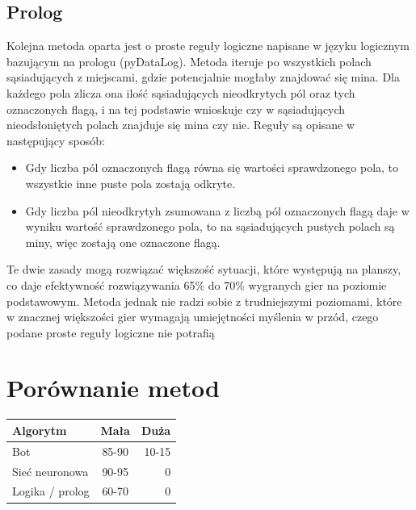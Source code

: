 \documentclass[letterpaper,12pt]{article}
\begin{document}
\subsection{Prolog}
Kolejna metoda oparta jest o proste reguły logiczne napisane w języku logicznym bazującym na prologu (pyDataLog).
Metoda iteruje po wszystkich polach sąsiadujących z miejscami, gdzie potencjalnie mogłaby znajdować się mina.
Dla każdego pola zlicza ona ilość sąsiadujących nieodkrytych pól oraz tych oznaczonych flagą, i na tej podstawie wnioskuje czy w sąsiadujących nieodsłoniętych polach znajduje się mina czy nie.
Reguły są opisane w następujący sposób:
\begin{itemize}
    \item{Gdy liczba pól oznaczonych flagą równa się wartości sprawdzonego pola, to wszystkie inne puste pola zostają odkryte.}
    \item{Gdy liczba pól nieodkrytyh zsumowana z liczbą pól oznaczonych flagą daje w wyniku wartość sprawdzonego pola, to na sąsiadujących pustych polach są miny, więc zostają one oznaczone flagą.}
\end{itemize}
Te dwie zasady mogą rozwiązać większość sytuacji, które występują na planszy, co daje efektywność rozwiązywania 65\% do 70\% wygranych gier na poziomie podstawowym.
Metoda jednak nie radzi sobie z trudniejszymi poziomami, które w znacznej większości gier wymagają umiejętności myślenia w przód, czego podane proste reguły logiczne nie potrafią
\hfill \break
\section{Porównanie metod}
\begin{center} 
    \begin{tabular}  { | l | c | r |   }
        \hline
        Algorytm & Mała & Duża  \\
        \hline
        Bot & 85-90 & 10-15 \\
        \hline
        Sieć neuronowa & 90-95 & 0 \\
        \hline
        Logika / prolog & 60-70 & 0  \\
        \hline
    \end{tabular}
\end{center}
\end{document}
